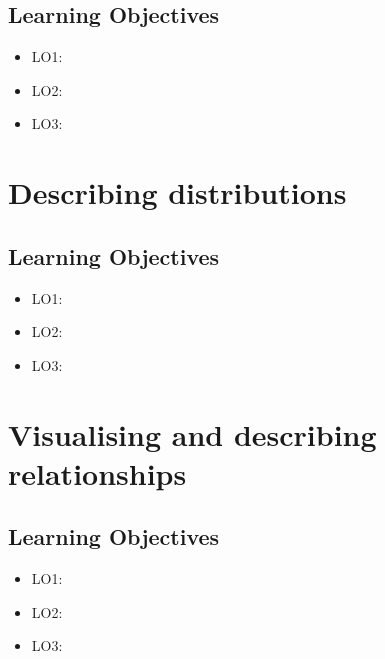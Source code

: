 \documentclass[]{book}
\providecommand{\tightlist}{%
  \setlength{\itemsep}{0pt}\setlength{\parskip}{0pt}}
\begin{document}
\hypertarget{learning-objectives-2}{%
\section*{Learning Objectives}\label{learning-objectives-2}}

\begin{itemize}
\tightlist
\item
  LO1:
\item
  LO2:
\item
  LO3:
\end{itemize}

\hypertarget{chap-describing-distributions}{%
\chapter{Describing distributions}\label{chap-describing-distributions}}

\hypertarget{learning-objectives-3}{%
\section*{Learning Objectives}\label{learning-objectives-3}}

\begin{itemize}
\tightlist
\item
  LO1:
\item
  LO2:
\item
  LO3:
\end{itemize}

\hypertarget{chap-relationships}{%
\chapter{Visualising and describing relationships}\label{chap-relationships}}

\hypertarget{learning-objectives-4}{%
\section*{Learning Objectives}\label{learning-objectives-4}}

\begin{itemize}
\tightlist
\item
  LO1:
\item
  LO2:
\item
  LO3:
\end{itemize}
\end{document}
